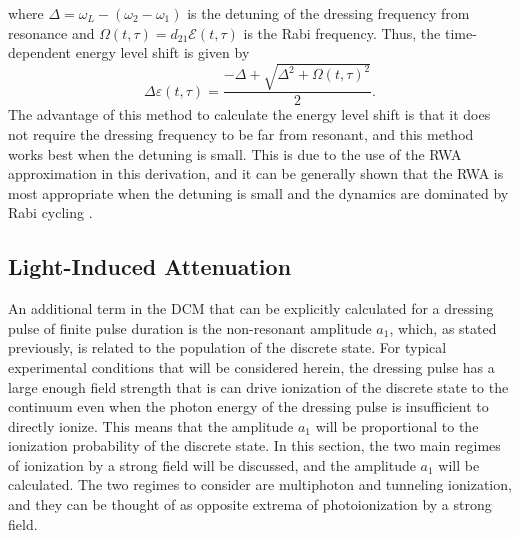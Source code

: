 where $\Delta=\omega_L-(\omega_2-\omega_1)$ is the detuning of the dressing frequency from resonance and $\Omega(t,\tau)=d_{21}\mathcal{E}(t,\tau)$ is the Rabi frequency.  Thus, the time-dependent energy level shift is given by
\begin{equation}
	\Delta\varepsilon(t,\tau)=\frac{-\Delta+\sqrt{\Delta^2+\Omega(t,\tau)^2}}{2}.
\end{equation}
The advantage of this method to calculate the energy level shift is that it does not require the dressing frequency to be far from resonant, and this method works best when the detuning is small.  This is due to the use of the RWA approximation in this derivation, and it can be generally shown that the RWA is most appropriate when the detuning is small and the dynamics are dominated by Rabi cycling \cite{wuTheoryStrongfieldAttosecond2016,wuTimedomainPerspectiveAutlerTownes2013}.

\subsection{Light-Induced Attenuation}
\label{sec:LIA}
An additional term in the DCM that can be explicitly calculated for a dressing pulse of finite pulse duration is the non-resonant amplitude $a_1$, which,  as stated previously, is related to the population of the discrete state.  For typical experimental conditions that will be considered herein, the dressing pulse has a large enough field strength that is can drive ionization of the discrete state to the continuum even when the photon energy of the dressing pulse is insufficient to directly ionize.  This means that the amplitude $a_1$ will be proportional to the ionization probability of the discrete state.  In this section, the two main regimes of ionization by a strong field will be discussed, and the amplitude $a_1$ will be calculated. The two regimes to consider are multiphoton and tunneling ionization, and they can be thought of as opposite extrema of photoionization by a strong field.  

